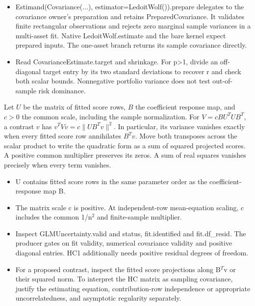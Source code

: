 \expandafter\def\csname statadic@diagnostics@STATADIC-SHRINKAGE-001\endcsname{\begin{itemize}
\item Estimand(Covariance(...), estimator=LedoitWolf()).prepare delegates to the covariance owner's preparation and retains PreparedCovariance. It validates finite rectangular observations and rejects zero marginal sample variances in a multi-asset fit. Native LedoitWolf.estimate and the bare kernel expect prepared inputs. The one-asset branch returns its sample covariance directly.
\item Read CovarianceEstimate.target and shrinkage. For p>1, divide an off-diagonal target entry by its two standard deviations to recover r and check both scalar bounds. Nonnegative portfolio variance does not test out-of-sample risk dominance.
\end{itemize}}
\expandafter\def\csname statadic@statement@STATADIC-GLMCOV-001\endcsname{Let $U$ be the matrix of fitted score rows, $B$ the
  coefficient response map, and $c>0$ the common scale, including the sample
  normalization. For $V=c BU^TUB^T$, a contrast $v$ has
  $v^TVv=c\|UB^Tv\|^2$. In particular, its variance vanishes exactly when
  every fitted score row annihilates $B^Tv$.}
\expandafter\def\csname statadic@proof@STATADIC-GLMCOV-001\endcsname{Move both transposes across the scalar product to write the
  quadratic form as a sum of squared projected scores. A positive common
  multiplier preserves its zeros. A sum of real squares vanishes precisely
  when every term vanishes.}
\expandafter\def\csname statadic@assumptions@STATADIC-GLMCOV-001\endcsname{\begin{itemize}
\item U contains fitted score rows in the same parameter order as the coefficient-response map B.
\item The matrix scale c is positive. At independent-row mean-equation scaling, c includes the common 1/n\ensuremath{{}^2} and finite-sample multiplier.
\end{itemize}}
\expandafter\def\csname statadic@diagnostics@STATADIC-GLMCOV-001\endcsname{\begin{itemize}
\item Inspect GLMUncertainty.valid and status, fit.identified and fit.df\_resid. The producer gates on fit validity, numerical covariance validity and positive diagonal entries. HC1 additionally needs positive residual degrees of freedom.
\item For a proposed contrast, inspect the fitted score projections along B\ensuremath{{}^T}v or their squared norm. To interpret the HC matrix as sampling covariance, justify the estimating equation, contribution-row independence or appropriate uncorrelatedness, and asymptotic regularity separately.
\end{itemize}}
